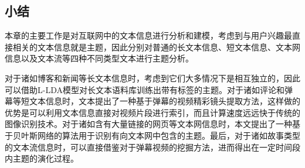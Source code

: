 \subsection{小结}
本章的主要工作是对互联网中的文本信息进行分析和建模，考虑到与用户兴趣最直接相关的文本信息就是主题，因此分别对普通的长文本信息、短文本信息、文本网信息以及文本流等四种不同类型文本进行主题分析。

对于诸如博客和新闻等长文本信息时，考虑到它们大多情况下是相互独立的，因此可以借助L-LDA模型对长文本语料库训练出带有标签的主题。对于诸如评论和弹幕等短文本信息时，文本提出了一种基于弹幕的视频精彩镜头提取方法，这样做的优势是可以利用文本信息直接对视频片段进行索引，而且计算速度远远快于传统的图像识别技术。对于诸如含有大量链接的网页等文本网信息时，本文提出了一种基于贝叶斯网络的算法用于识别有向文本网中包含的主题。最后，对于诸如故事类型的文本流信息时，可以直接借鉴对于弹幕视频的挖掘方法，进而得出在一定时间段内主题的演化过程。
